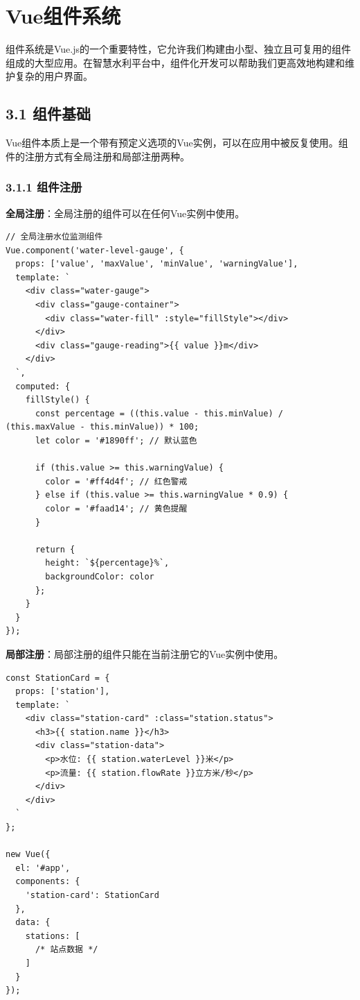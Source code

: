 \section{Vue组件系统}\label{vueux7ec4ux4ef6ux7cfbux7edf}

组件系统是Vue.js的一个重要特性，它允许我们构建由小型、独立且可复用的组件组成的大型应用。在智慧水利平台中，组件化开发可以帮助我们更高效地构建和维护复杂的用户界面。

\subsection{3.1 组件基础}\label{ux7ec4ux4ef6ux57faux7840}

Vue组件本质上是一个带有预定义选项的Vue实例，可以在应用中被反复使用。组件的注册方式有全局注册和局部注册两种。

\subsubsection{3.1.1 组件注册}\label{ux7ec4ux4ef6ux6ce8ux518c}

\textbf{全局注册}：全局注册的组件可以在任何Vue实例中使用。

\begin{lstlisting}
// 全局注册水位监测组件
Vue.component('water-level-gauge', {
  props: ['value', 'maxValue', 'minValue', 'warningValue'],
  template: `
    <div class="water-gauge">
      <div class="gauge-container">
        <div class="water-fill" :style="fillStyle"></div>
      </div>
      <div class="gauge-reading">{{ value }}m</div>
    </div>
  `,
  computed: {
    fillStyle() {
      const percentage = ((this.value - this.minValue) / (this.maxValue - this.minValue)) * 100;
      let color = '#1890ff'; // 默认蓝色
      
      if (this.value >= this.warningValue) {
        color = '#ff4d4f'; // 红色警戒
      } else if (this.value >= this.warningValue * 0.9) {
        color = '#faad14'; // 黄色提醒
      }
      
      return {
        height: `${percentage}%`,
        backgroundColor: color
      };
    }
  }
});
\end{lstlisting}

\textbf{局部注册}：局部注册的组件只能在当前注册它的Vue实例中使用。

\begin{lstlisting}
const StationCard = {
  props: ['station'],
  template: `
    <div class="station-card" :class="station.status">
      <h3>{{ station.name }}</h3>
      <div class="station-data">
        <p>水位: {{ station.waterLevel }}米</p>
        <p>流量: {{ station.flowRate }}立方米/秒</p>
      </div>
    </div>
  `
};

new Vue({
  el: '#app',
  components: {
    'station-card': StationCard
  },
  data: {
    stations: [
      /* 站点数据 */
    ]
  }
});
\end{lstlisting}

